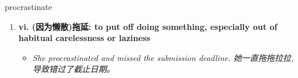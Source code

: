 
\begin{frame}
{\huge procrastinate}
\begin{center}
\begin{enumerate}\Large
  \item \textbf{vi. (因为懒散)拖延: to put off doing something, especially out of habitual carelessness or laziness}
  \begin{itemize}
    \item \em{\Large{She procrastinated and missed the submission deadline. 她一直拖拖拉拉,导致错过了截止日期。}}
  \end{itemize}
\end{enumerate}
\end{center}
\end{frame}
